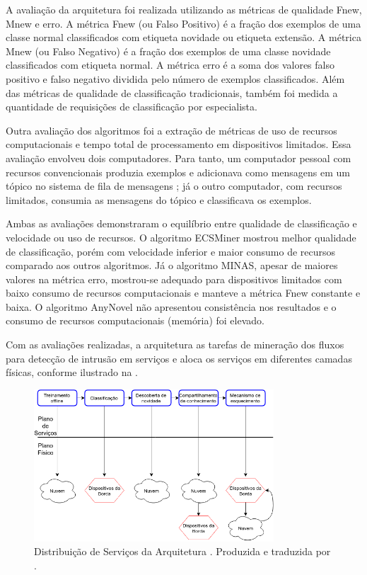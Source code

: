 A avaliação da arquitetura foi realizada utilizando as métricas de qualidade
Fnew, Mnew e erro.
A métrica Fnew (ou Falso Positivo) é a fração dos exemplos de uma classe normal
classificados com etiqueta novidade ou etiqueta extensão.
A métrica Mnew (ou Falso Negativo) é a fração dos exemplos de uma classe novidade
classificados com etiqueta normal.
A métrica erro é a soma dos valores falso positivo e falso negativo dividida
pelo número de exemplos classificados.
Além das métricas de qualidade de classificação tradicionais, também foi medida
a quantidade de requisições de classificação por especialista.

Outra avaliação dos algoritmos foi a extração de métricas de uso de recursos
computacionais e tempo total de processamento em dispositivos limitados.
Essa avaliação envolveu dois computadores.
Para tanto, um computador pessoal com recursos
convencionais produzia exemplos e adicionava como mensagens em um tópico no
sistema de fila de mensagens \kafka; já o outro computador, com recursos
limitados, consumia as mensagens do tópico e classificava os exemplos.

Ambas as avaliações demonstraram o equilíbrio entre qualidade de classificação e
velocidade ou uso de recursos.
O algoritmo ECSMiner mostrou melhor qualidade de classificação, porém com
velocidade inferior e maior consumo de recursos comparado aos outros algoritmos.
Já o algoritmo MINAS, apesar de maiores valores na métrica erro, mostrou-se
adequado para dispositivos limitados com baixo consumo de recursos
computacionais e manteve a métrica Fnew constante e baixa.
O algoritmo AnyNovel não apresentou consistência nos resultados e o consumo
de recursos computacionais (memória) foi elevado.


Com as avaliações realizadas, a arquitetura \idsiot {} as
tarefas de mineração dos fluxos para detecção de intrusão em serviços e aloca os
serviços em diferentes camadas físicas, conforme ilustrado na .

\begin{figure}[hbt]
\centering
\includegraphics[width=0.8\textwidth]{figuras/idsa-iot-quali-004.png}
\caption{Distribuição de Serviços da Arquitetura \idsiot.
Produzida e traduzida por .}
\label{fig:ids-iot}
\end{figure}

